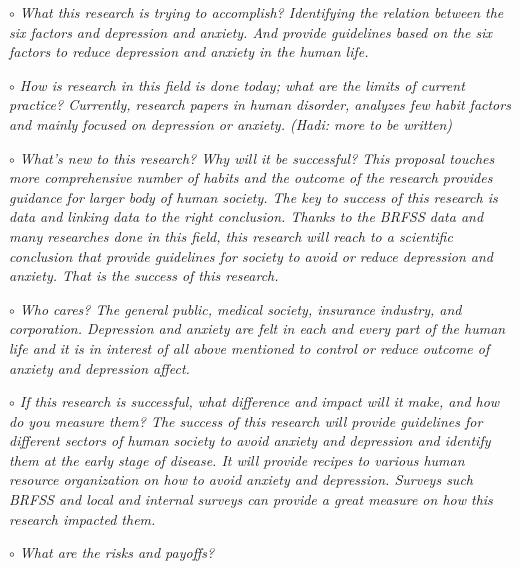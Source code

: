 \documentclass[letterpaper, 10 pt, conference]{ieeeconf}  %
\begin{document}
\noindent\it{$\circ$ What this research is trying to accomplish?} \newline
\textnormal{
Identifying the relation between the six factors and depression and anxiety. 
And provide guidelines based on the six factors to reduce depression and anxiety in the human life.
}

\setlength{\parskip}{1em} %

\par\noindent\it{$\circ$ How is research in this field is done today; what are the limits of current practice?}\newline
\textnormal{
Currently, research papers in human disorder, analyzes few habit factors 
and mainly focused on depression or anxiety. (Hadi: more to be written) 
}
\par\noindent\it{$\circ$ What's new to this research? Why will it be successful?}\newline
\textnormal{
This proposal touches more comprehensive number of habits and the outcome of the 
research provides guidance for larger body of human society. The key to success 
of this research is data and linking data to the right conclusion. Thanks to the 
BRFSS data and many researches done in this field, this research will reach to a 
scientific conclusion that provide guidelines for society to avoid or reduce 
depression and anxiety. That is the success of this research.
}
\par\noindent\it{$\circ$ Who cares?}\newline
\textnormal{
The general public, medical society, insurance industry, and corporation. Depression 
and anxiety are felt in each and every part of the human life and it is in interest 
of all above mentioned to control or reduce outcome of anxiety and depression affect.
}
\par\noindent\it{$\circ$ If this research is successful, what difference and impact will it make, and how do you measure them?}\newline
\textnormal{
The success of this research will provide guidelines for different sectors of 
human society to avoid anxiety and depression and identify them at the early 
stage of disease. It will provide recipes to various human resource organization 
on how to avoid anxiety and depression. Surveys such BRFSS and local and internal 
surveys can provide a great measure on how this research impacted them.
}
\par\noindent\it{$\circ$ What are the risks and payoffs?}\newline
\end{document}
